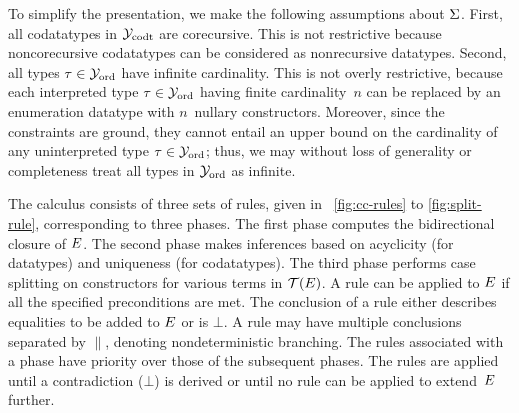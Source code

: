 To simplify the presentation, we make the following assumptions about $\mathrm{\Sigma}$.
First, all codatatypes in $\mathcal{Y}_{\mathrm{codt}}$ are corecursive. This is not restrictive
because noncorecursive codatatypes can be considered as nonrecursive
datatypes.
Second, all types $\tau \in \mathcal{Y}_{\mathrm{ord}}$ have infinite cardinality.
This is not overly restrictive, because each interpreted type $\tau \in \mathcal{Y}_{\mathrm{ord}}$
having finite cardinality~$n$
can be replaced by an enumeration datatype with $n$~nullary constructors.
Moreover, since the constraints are ground, they cannot entail an upper bound
on the cardinality of any uninterpreted type $\tau \in \mathcal{Y}_{\mathrm{ord}}$; thus,
we may without loss of generality or completeness treat all types in $\mathcal{Y}_{\mathrm{ord}}$ as infinite.

The calculus consists of three sets of rules, given in \figuresname~\ref{fig:cc-rules} to
\ref{fig:split-rule}, corresponding to three phases. The first
phase computes the bidirectional closure of $E$. The second phase makes
inferences based on acyclicity (for datatypes) and uniqueness (for
codatatypes). The third phase performs case splitting on constructors for
various terms in $\mathcal{T}(E)$.
A rule can be applied to $E$ if all the specified preconditions are met.
The conclusion of a rule either describes equalities to be added to $E$
or is $\bot$.
A rule may have multiple conclusions separated by $\parallel$,
denoting nondeterministic branching. The rules associated with a phase have
priority over those of the subsequent phases. The rules are applied
until a contradiction ($\bot$) is derived or until no rule can be applied to
extend~$E$ further.


